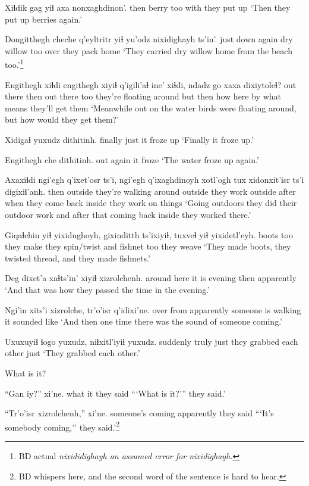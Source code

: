 \documentclass[12pt]{article}
\begin{document}
\gll Xiɬdik gag yiɬ axa nonxaghdinon'.
then berry too with {they put up}
\glt `Then they put up berries again.'
\glend

\gll Dongitthegh cheche q'eyltritr yiɬ yu'odz nixidighayh ts'in'.
{just down} again {dry willow} too over {they pack home} {}
\glt `They carried dry willow home from the beach too.'\footnote{BD actual \em nixididighayh \em an assumed error for \em nixidighayh.}
\glend

\gll Engithegh xiɬdi engithegh xiyiɬ q'igili'aɬ ine' xiɬdi, ndadz go xaxa dixiytoleɬ?
{out there} then {out there} too {they're floating around} but then how here {by what means} {they'll get them}
\glt `Meanwhile out on the water birds were floating around, but how would they get them?'
\glend

\gll Xidigaɬ yuxudz dithitinh.
finally just {it froze up}
\glt `Finally it froze up.'
\glend

\gll Engithegh che dithitinh.
{out} again {it froze}
\glt `The water froze up again.'
\glend

\gll Axaxiɬdi ngi'egh q'ixet'osr ts'i, ngi'egh q'ixaghdinoyh xotl'ogh tux xidonxit'isr ts'i digixiɬ'anh.
then outside {they're walking around} {} outside {they work outside}  after when {they come back inside} {} {they work on things}
\glt `Going outdoors they did their outdoor work and after that coming back inside they worked there.'
\glend

\gll Giqaɬchin yiɬ yixidughoyh, gixinditth ts'ixiyiɬ, tuxveɬ yiɬ yixidetl'eyh.
boots too {they make} {they spin/twist} and fishnet too {they weave}
\glt `They made boots, they twisted thread, and they made fishnets.'
\glend

\gll Deg dixet'a xaɬts'in' xiyiɬ xizrolchenh.
{around here} {it is} evening then apparently
\glt `And that was how they passed the time in the evening.'
\glend

\gll Ngi'in xits'i xizrolche, tr'o'isr q'idixi'ne.
over from apparently {someone is walking} {it sounded like}
\glt `And then one time there was the sound of someone coming.'
\glend

\gll Uxuxuyiɬ ɬogo yuxudz, niɬxitl'iyiɬ yuxudz. 
suddenly truly just {they grabbed each other} just
\glt `They grabbed each other.'
\glend

What is it?

\gll ``Gan iy?'' xi'ne.
what it {they said}
\glt ```What is it?''' they said.'
\glend

\gll ``Tr'o'isr xizrolchenh,'' xi'ne.
{someone's coming} apparently {they said}
\glt ```It's somebody coming,'' they said.'\footnote{BD whispers here, and the second word of the sentence is hard to hear.}
\glend
\end{document}
